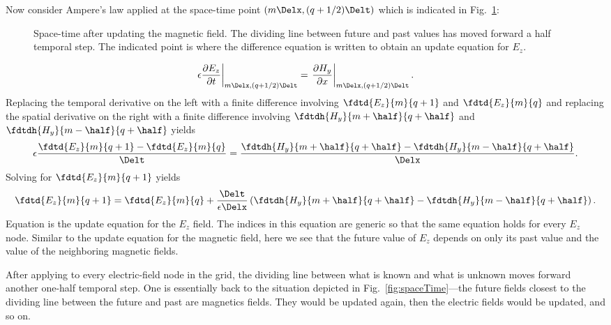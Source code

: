 Now consider Ampere's law  applied at the
space-time point $(m\Delx,(q+1/2)\Delt)$ which is indicated in Fig.\
\ref{fig:spaceTimeUpdate}:
\begin{figure}
  \begin{center}
  \end{center}
  \caption{Space-time after updating the magnetic field.  The dividing
  line between future and past values has moved forward a half
  temporal step.  The indicated point is where the difference equation
  is written to obtain an update equation for $E_z$.}
  \label{fig:spaceTimeUpdate}
\end{figure}
\begin{equation}
  \left.\epsilon
  \frac{\partial E_z}{\partial t}\right|_{m\Delx,(q+1/2)\Delt}
  =
  \left.\frac{\partial H_y}{\partial x}\right|_{m\Delx,(q+1/2)\Delt}.
\end{equation}
Replacing the temporal derivative on the left with a finite
difference involving $\fdtd{E_z}{m}{q+1}$ and $\fdtd{E_z}{m}{q}$
and replacing the spatial derivative on the right with a finite
difference involving $\fdtdh{H_y}{m+\half}{q+\half}$ and
$\fdtdh{H_y}{m-\half}{q+\half}$ yields
\begin{equation}
  \epsilon\frac{\fdtd{E_z}{m}{q+1} - \fdtd{E_z}{m}{q}}{\Delt} = 
  \frac{\fdtdh{H_y}{m+\half}{q+\half} - \fdtdh{H_y}{m-\half}{q+\half}}{\Delx}.
  \label{eq:ampereFdtd1D}
\end{equation}
Solving for $\fdtd{E_z}{m}{q+1}$ yields
\begin{equation}
  \fdtd{E_z}{m}{q+1} = \fdtd{E_z}{m}{q} + 
  \frac{\Delt}{\epsilon\Delx}
   \left(\fdtdh{H_y}{m+\half}{q+\half} - \fdtdh{H_y}{m-\half}{q+\half}\right).
  \label{eq:updateEz}
\end{equation}
Equation  is the update equation for the $E_z$
field.  The indices in this equation are generic so that the same
equation holds for every $E_z$ node.  Similar to the update equation for
the magnetic field, here we see that the future value of $E_z$ depends
on only its past value and the value of the neighboring magnetic
fields.

After applying  to every electric-field node in the
grid, the dividing line between what is known and what is unknown
moves forward another one-half temporal step.  One is essentially back
to the situation depicted in Fig.\ \ref{fig:spaceTime}---the future
fields closest to the dividing line between the future and past are
magnetics fields.  They would be updated again, then the electric
fields would be updated, and so on.

